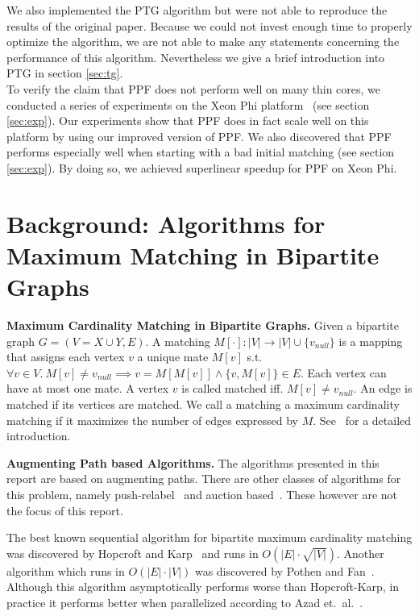 \documentclass[letterpaper]{article}
\newcommand{\mypar}[1]{{\bf #1.}}
\begin{document}
We also implemented the PTG algorithm but were not able to reproduce the results of the original paper. 
Because we could not invest enough time to properly optimize the algorithm, we are not able to make any statements concerning the performance of this algorithm.
Nevertheless we give a brief introduction into PTG in section \ref{sec:tg}.\\

To verify the claim that PPF does not perform well on many thin cores, we conducted a series of experiments on the Xeon Phi platform~\cite{XeonPhi} (see section \ref{sec:exp}). 
Our experiments show that PPF does in fact scale well on this platform by using our improved version of PPF. We also discovered that PPF
performs especially well when starting with a bad initial matching (see section \ref{sec:exp}). 
By doing so, we achieved superlinear speedup for PPF on Xeon Phi.

\section{Background: Algorithms for Maximum Matching in Bipartite Graphs}\label{sec:background}

\mypar{Maximum Cardinality Matching in Bipartite Graphs}
Given a bipartite graph $G = (V = X \cup Y, E)$.
A matching $M[\cdot]: |V| \rightarrow |V| \cup \{v_{null}\}$ is a mapping that assigns each vertex $v$ a unique mate $M[v]$ s.t. 
$\forall v \in V.\ M[v] \neq v_{null} \implies v = M[M[v]] \wedge \{v, M[v]\} \in E$.
Each vertex can have at most one mate. A vertex $v$ is called matched iff. $M[v] \neq v_{null}$. An edge is matched if its vertices are matched. 
We call a matching a maximum cardinality matching if it maximizes the number of edges expressed by $M$. See~\cite{intro_alg} for a detailed introduction.

\mypar{Augmenting Path based Algorithms}
The algorithms presented in this report are based on augmenting paths. 
There are other classes of algorithms for this problem, namely push-relabel~\cite{GoldbergT88} and auction based~\cite{Bertsekas}. 
These however are not the focus of this report. 

The best known sequential algorithm for bipartite maximum cardinality matching was discovered by Hopcroft and Karp~\cite{HK:1973}
and runs in $O(|E|\cdot \sqrt{|V|})$. Another algorithm which runs in $O(|E|\cdot|V|)$ was discovered by Pothen and Fan~\cite{Pothen:1990}.
Although this algorithm asymptotically performs worse than Hopcroft-Karp, in practice it performs better when parallelized according to Azad et.\ al.~\cite{Azad:2012}.
\end{document}
